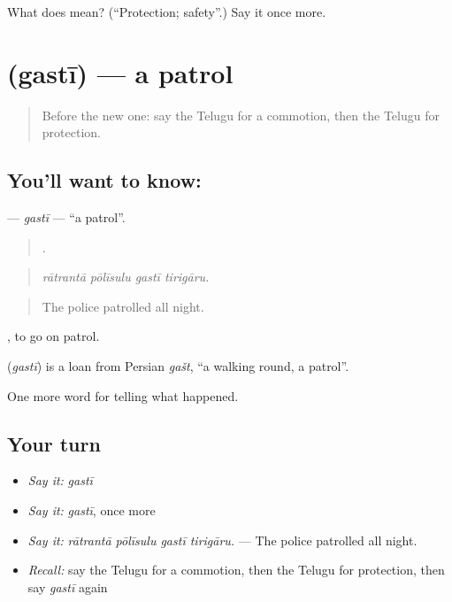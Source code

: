 \begin{tcolorbox}[breakable,colback=teal!4,colframe=teal!35!black,title={Before you move on}]
What does  mean? (\textquotedblleft{}Protection; safety\textquotedblright{}.) Say it once more.
\end{tcolorbox}
\section[\texorpdfstring{\te{గస్తీ} (gastī)}{గస్తీ (gastī)}]{ (gastī) — a patrol}

\label{lesson:TE-C377-gasti}



\begin{quote}
Before the new one: say the Telugu for a commotion, then the Telugu for protection.
\end{quote}

\subsection*{You'll want to know: }
\textbf{} — \emph{gastī} — \textquotedblleft{}a patrol\textquotedblright{}.

\begin{quote}
   .
\end{quote}

\begin{quote}
\emph{rātrantā pōlīsulu gastī tirigāru.}
\end{quote}

\begin{quote}
The police patrolled all night.
\end{quote}

 , to go on patrol.

\begin{cousinweb}
\textbf{} (\emph{gastī}) is a loan from Persian \emph{gašt}, \textquotedblleft{}a walking round, a patrol\textquotedblright{}.
\end{cousinweb}

\begin{grammarlens}[title={What you've built}]
One more word for telling what happened.
\end{grammarlens}

\subsection*{Your turn}
\begin{itemize}
\raggedright
  \item \emph{Say it:} \emph{gastī}
  \item \emph{Say it:} \emph{gastī}, once more
  \item \emph{Say it:} \emph{rātrantā pōlīsulu gastī tirigāru.} — The police patrolled all night.
  \item \emph{Recall:} say the Telugu for a commotion, then the Telugu for protection, then say \emph{gastī} again
\end{itemize}

